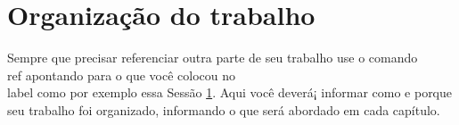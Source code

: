 



\section{Organização do trabalho}
\label{Sec:Organização}
Sempre que precisar referenciar outra parte de seu trabalho use o comando \\ref apontando para o que você colocou no \\label como por exemplo essa Sessão \ref{Sec:Organização}. Aqui você deverá¡ informar como e porque seu trabalho foi organizado, informando o que será abordado em cada capítulo.